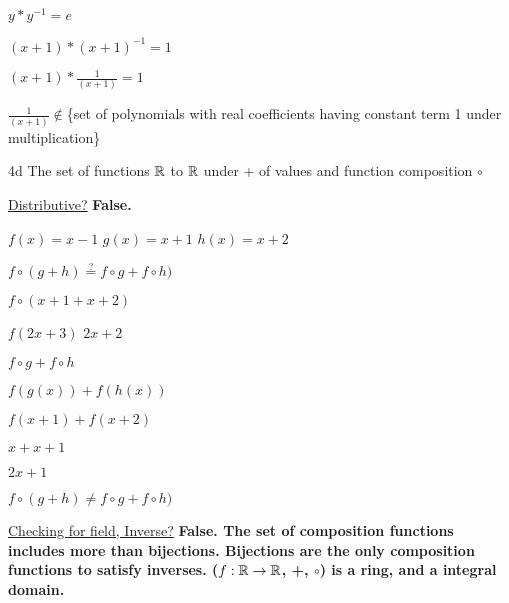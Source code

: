 $y * y^{-1} = e$

$(x+1) * (x+1)^{-1} = 1$

$(x+1) * \frac{1}{(x+1)} = 1$

$\frac{1}{(x+1)} \notin $\{set of polynomials with real coefficients having constant term 1 under multiplication\}


\begin{question}{4d}
The set of functions $\mathbb{R}$ to $\mathbb{R}$ under + of values and function composition $\circ$
\end{question}

\underline{Distributive?} \textbf{False.}

$f(x) = x-1$
$g(x) = x+1$
$h(x) = x+2$

$f \circ (g+h) \stackrel{?}{=} f \circ g + f \circ h)$

$f \circ (x+1+x+2)$

$f(2x+3)$
$2x+2$

$f \circ g + f \circ h$

$f(g(x)) + f(h(x))$

$f(x+1) + f(x+2)$

$x + x+1$

$2x+1$

$f \circ (g+h) \neq f \circ g + f \circ h)$


\underline{Checking for field, Inverse?} \textbf{False. The set of composition functions includes more than bijections. Bijections are the only composition functions to satisfy inverses. ({$f : \mathbb{R} \rightarrow \mathbb{R}$}, +, $\circ$) is a ring, and a integral domain.}

